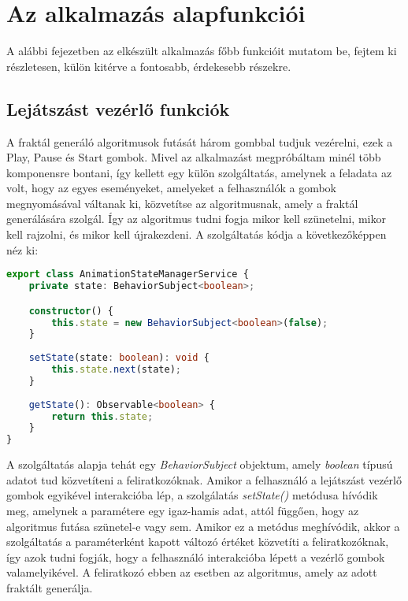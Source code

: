 \chapter{Az alkalmazás alapfunkciói}

A alábbi fejezetben az elkészült alkalmazás főbb funkcióit mutatom be, fejtem ki részletesen, külön kitérve a fontosabb, érdekesebb részekre.

\section{Lejátszást vezérlő funkciók}

A fraktál generáló algoritmusok futását három gombbal tudjuk vezérelni, ezek a Play, Pause és Start gombok. Mivel az alkalmazást megpróbáltam minél több komponensre bontani, így kellett egy külön szolgáltatás, amelynek a feladata az volt, hogy az egyes eseményeket, amelyeket a felhasználók a gombok megnyomásával váltanak ki, közvetítse az algoritmusnak, amely a fraktál generálására szolgál. Így az algoritmus tudni fogja mikor kell szünetelni, mikor kell rajzolni, és mikor kell újrakezdeni. A szolgáltatás kódja a következőképpen néz ki:
\begin{lstlisting}[language=typescript]
export class AnimationStateManagerService {
	private state: BehaviorSubject<boolean>;

	constructor() {
		this.state = new BehaviorSubject<boolean>(false);
	}
	
	setState(state: boolean): void {
		this.state.next(state);
	}
	
	getState(): Observable<boolean> {
		return this.state;
	}
}
\end{lstlisting}
A szolgáltatás alapja tehát egy {\it BehaviorSubject} objektum, amely {\it boolean} típusú adatot tud közvetíteni a feliratkozóknak. Amikor a felhasználó a lejátszást vezérlő gombok egyikével interakcióba lép, a szolgálatás {\it setState()} metódusa hívódik meg, amelynek a paramétere egy igaz-hamis adat, attól függően, hogy az algoritmus futása szünetel-e vagy sem. Amikor ez a metódus meghívódik, akkor a szolgáltatás a paraméterként kapott változó értéket közvetíti a feliratkozóknak, így azok tudni fogják, hogy a felhasználó interakcióba lépett a vezérlő gombok valamelyikével. A feliratkozó ebben az esetben az algoritmus, amely az adott fraktált generálja.

